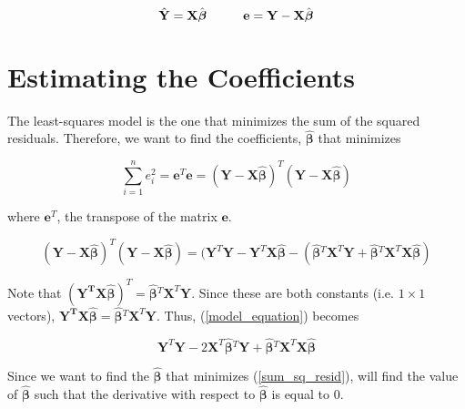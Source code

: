 \documentclass[]{book}
\begin{document}
\begin{equation}
\label{matrix_mean}
\hat{\mathbf{Y}} = \mathbf{X}\hat{\boldsymbol{\beta}} \hspace{10mm} \mathbf{e} = \mathbf{Y} - \mathbf{X}\hat{\boldsymbol{\beta}}
\end{equation}

\section{Estimating the Coefficients}\label{estimating-the-coefficients}

The least-squares model is the one that minimizes the sum of the squared
residuals. Therefore, we want to find the coefficients,
\(\hat{\boldsymbol{\beta}}\) that minimizes

\begin{equation}
\label{sum_sq_resid}
\sum\limits_{i=1}^{n} e_{i}^2 = \mathbf{e}^T\mathbf{e} = (\mathbf{Y} - \mathbf{X}\hat{\boldsymbol{\beta}})^T(\mathbf{Y} - \mathbf{X}\hat{\boldsymbol{\beta}})
\end{equation}

where \(\mathbf{e}^T\), the transpose of the matrix \(\mathbf{e}\).

\begin{equation}
\label{model_equation}
(\mathbf{Y} - \mathbf{X}\hat{\boldsymbol{\beta}})^T(\mathbf{Y} - \mathbf{X}\hat{\boldsymbol{\beta}}) = (\mathbf{Y}^T\mathbf{Y} - 
\mathbf{Y}^T \mathbf{X}\hat{\boldsymbol{\beta}} - (\hat{\boldsymbol{\beta}}{}^{T}\mathbf{X}^T\mathbf{Y} +
\hat{\boldsymbol{\beta}}{}^{T}\mathbf{X}^T\mathbf{X}
\hat{\boldsymbol{\beta}})
\end{equation}

Note that
\((\mathbf{Y^T}\mathbf{X}\hat{\boldsymbol{\beta}})^T = \hat{\boldsymbol{\beta}}{}^{T}\mathbf{X}^T\mathbf{Y}\).
Since these are both constants (i.e. \(1\times 1\) vectors),
\(\mathbf{Y^T}\mathbf{X}\hat{\boldsymbol{\beta}} = \hat{\boldsymbol{\beta}}{}^{T}\mathbf{X}^T\mathbf{Y}\).
Thus, (\ref{model_equation}) becomes

\begin{equation}
\mathbf{Y}^T\mathbf{Y} - 2 \mathbf{X}^T\hat{\boldsymbol{\beta}}{}^{T}\mathbf{Y} + \hat{\boldsymbol{\beta}}{}^{T}\mathbf{X}^T\mathbf{X}
\hat{\boldsymbol{\beta}}
\end{equation}

Since we want to find the \(\hat{\boldsymbol{\beta}}\) that minimizes
(\ref{sum_sq_resid}), will find the value of
\(\hat{\boldsymbol{\beta}}\) such that the derivative with respect to
\(\hat{\boldsymbol{\beta}}\) is equal to 0.
\end{document}

